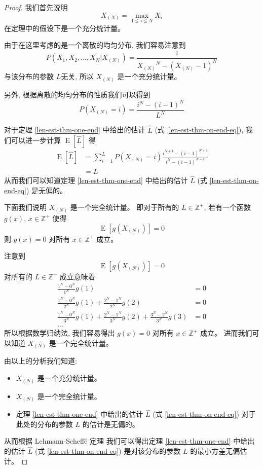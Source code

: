\begin{proof}
我们首先说明 
\[
X_{(N)} = \max_{1 \leq i \leq N} X_i
\] 
在定理中的假设下是一个充分统计量。 

由于在这里考虑的是一个离散的均匀分布, 我们容易注意到
\[
P(X_1, X_2, \ldots, X_N | X_{(N)}) = \frac{1}{ {X_{(N)}}^N - (X_{(N)} - 1)^N }
\]
与该分布的参数 $L$无关, 所以 $X_{(N)}$ 是一个充分统计量。 

另外, 根据离散的均匀分布的性质我们可以得到
\[
P(X_{(N)} = i) = \frac{ i^N - (i - 1)^N }{L^N}
\]

对于定理 \ref{len-est-thm-one-end} 中给出的估计 $\hat{L}$ 
(式 \eqref{len-est-thm-on-end-eq}), 
我们可以进一步计算 $\operatorname{E}[\hat{L}]$ 得
\begin{align*}
\operatorname{E}[\hat{L}] &= \sum_{i=1}^L P(X_{(N)} = i) 
    \frac{i^{N+1} - (i-1)^{N+1}}{i^N-(i-1)^{N-1}} \\
&= L
\end{align*}
从而我们可以知道定理 \ref{len-est-thm-one-end} 中给出的估计 $\hat{L}$ 
(式 \eqref{len-est-thm-on-end-eq}) 是无偏的。 

下面我们说明 $X_{(N)}$ 是一个完全统计量。 
即对于所有的 $L \in \mathbb{Z}^+$, 若有一个函数 $g(x)$, $x \in \mathbb{Z}^+$ 使得
\[
\operatorname{E}[g(X_{(N)})] = 0
\]
则 $g(x) = 0$ 对所有 $x \in \mathbb{Z}^+$ 成立。 

注意到
\[
\operatorname{E}[g(X_{(N)})] = 0
\]
对所有的 $L \in \mathbb{Z}^+$ 成立意味着
\begin{align*}
\frac{1^N - 0^N}{1^N} g(1) &= 0 \\
\frac{1^N - 0^N}{2^N} g(1) + \frac{2^N - 1^N}{2^N} g(2) &= 0 \\
\frac{1^N - 0^N}{3^N} g(1) + \frac{2^N - 1^N}{3^N} g(2) + \frac{3^N - 2^N}{3^N} g(3) &= 0 \\
\ldots
\end{align*}
所以根据数学归纳法, 我们容易得出 $g(x) = 0$ 对所有 $x \in \mathbb{Z}^+$ 成立。 
进而我们可以知道 $X_{(N)}$ 是一个完全统计量。 

由以上的分析我们知道: 
\begin{itemize}
\item $X_{(N)}$ 是一个充分统计量。
\item $X_{(N)}$ 是一个完全统计量。
\item 定理 \ref{len-est-thm-one-end} 中给出的估计 $\hat{L}$ 
(式 \eqref{len-est-thm-on-end-eq}) 对于此处的分布的参数 $L$ 的估计是无偏的。
\end{itemize}
从而根据 Lehmann-Scheff{\'e} 定理
\cite{lehmann2012completeness.p1, lehmann2012completeness.p2} 
我们可以得出定理 \ref{len-est-thm-one-end} 中给出的估计 $\hat{L}$ 
(式 \eqref{len-est-thm-on-end-eq}) 是对该分布的参数 $L$ 的最小方差无偏估计。 

\end{proof}

